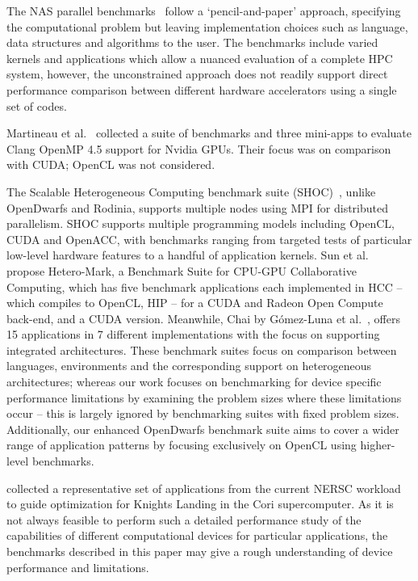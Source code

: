 \documentclass[../document.tex]{subfiles}
\begin{document}
\label{sec:related_work}
	
The NAS parallel benchmarks~\cite{bailey1991parallel} follow a `pencil-and-paper' approach, specifying the computational problem but leaving implementation choices such as language, data structures and algorithms to the user.
The benchmarks include varied kernels and applications which allow a nuanced evaluation of a complete HPC system, however, the unconstrained approach does not readily support direct performance comparison between different hardware accelerators using a single set of codes.

Martineau et al.~\cite{martineau2016performance} collected a suite of benchmarks and three mini-apps to evaluate Clang OpenMP 4.5 support for Nvidia GPUs.
Their focus was on comparison with CUDA; OpenCL was not considered.

The Scalable Heterogeneous Computing benchmark suite (SHOC)~\cite{lopez2015examining}, unlike OpenDwarfs and Rodinia, supports multiple nodes using MPI for distributed parallelism.
SHOC supports multiple programming models including OpenCL, CUDA and OpenACC, with benchmarks ranging from targeted tests of particular low-level hardware features to a handful of application kernels.
Sun et al.~\cite{sun2016} propose Hetero-Mark, a Benchmark Suite for CPU-GPU Collaborative Computing, which has five benchmark applications each implemented in HCC -- which compiles to OpenCL, HIP -- for a CUDA and Radeon Open Compute back-end, and a CUDA version.
Meanwhile, Chai by G{\'o}mez-Luna et al.~\cite{gomez2017chai}, offers 15 applications in 7 different implementations with the focus on supporting integrated architectures.
These benchmark suites focus on comparison between languages, environments and the corresponding support on heterogeneous architectures; whereas our work focuses on benchmarking for device specific performance limitations by examining the problem sizes where these limitations occur -- this is largely ignored by benchmarking suites with fixed problem sizes.
Additionally, our enhanced OpenDwarfs benchmark suite aims to cover a wider range of application patterns by focusing exclusively on OpenCL using higher-level benchmarks.

\citet{barnes2016evaluating} collected a representative set of applications from the current NERSC workload to guide optimization for Knights Landing in the Cori supercomputer.
As it is not always feasible to perform such a detailed performance study of the capabilities of different computational devices for particular applications, the benchmarks described in this paper may give a rough understanding of device performance and limitations.
\end{document}

